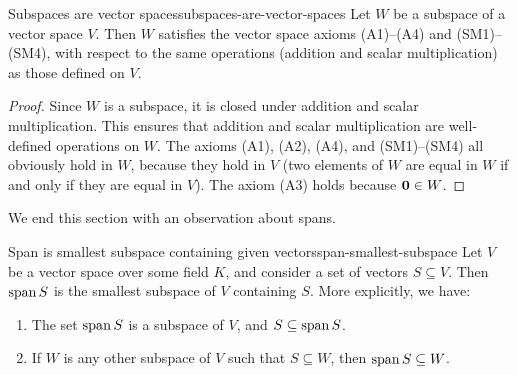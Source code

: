 \begin{proposition}{Subspaces are vector spaces}{subspaces-are-vector-spaces}
  Let $W$ be a subspace of a vector space $V$. Then $W$ satisfies the
  vector space axioms (A1)--(A4) and (SM1)--(SM4), with respect to the
  same operations (addition and scalar multiplication) as those
  defined on $V$.
\end{proposition}

\begin{proof}
  Since $W$ is a subspace, it is closed under addition and scalar
  multiplication. This ensures that addition and scalar multiplication
  are well-defined operations on $W$. The axioms (A1), (A2), (A4), and
  (SM1)--(SM4) all obviously hold in $W$, because they hold in $V$
  (two elements of\/ $W$ are equal in $W$ if and only if they are equal
  in $V$). The axiom (A3) holds because $\mbox{\bf 0}\in W$.
\end{proof}

We end this section with an observation about spans.

\begin{proposition}{Span is smallest subspace containing given vectors}{span-smallest-subspace}
  Let $V$ be a vector space over some field $K$, and consider a set of
  vectors $S\subseteq V$. Then $\sspan S$ is the smallest subspace of\/
  $V$ containing $S$. More explicitly, we have:
  \begin{enumialphparenastyle}
    \begin{enumerate}
    \item The set $\sspan S$ is a subspace of\/ $V$, and
      $S\subseteq \sspan S$.
    \item If $W$ is any other subspace of\/ $V$ such that
      $S\subseteq W$, then $\sspan S\subseteq W$.
    \end{enumerate}
  \end{enumialphparenastyle}
\end{proposition}

